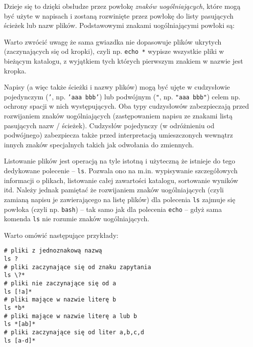 Dzieje się to dzięki obsłudze przez powłokę \textit{znaków uogólniających}, które mogą być użyte w napisach i zostaną rozwinięte przez powłokę do listy pasujących ścieżek lub nazw plików.
Podstawowymi znakami uogólniającymi powłoki są:
Warto zwrócić uwagę że sama gwiazdka nie dopasowuje plików ukrytych (zaczynających się od kropki), czyli np. \Verb$echo *$ wypisze wszystkie pliki w bieżącym katalogu, z wyjątkiem tych których pierwszym znakiem w nazwie jest kropka.

Napisy (a więc także ścieżki i nazwy plików) mogą być ujęte w cudzysłowie pojedynczym (\texttt{'}, np. \texttt{'aaa bbb'}) lub podwójnym (\texttt{"}, np. \texttt{"aaa bbb"}) celem np. ochrony spacji w nich występujących.
Oba typy cudzysłowów zabezpieczają przed rozwijaniem znaków uogólniających (zastępowaniem napisu ze znakami listą pasujących nazw / ścieżek).
Cudzysłów pojedynczy (w odróżnieniu od podwójnego) zabezpiecza także przed interpretacją umieszczonych wewnątrz innych znaków specjalnych takich jak odwołania do zmiennych.

Listowanie plików jest operacją na tyle istotną i użyteczną że istnieje do tego dedykowane polecenie – \Verb$ls$. Pozwala ono na m.in. wypisywanie szczegółowych informacji o plikach, listowanie całej zawartości katalogu, sortowanie wyników itd.
Należy jednak pamiętać że rozwijaniem znaków uogólniających (czyli zamianą napisu je zawierającego na listę plików) dla polecenia \Verb$ls$ zajmuje się powłoka (czyli np. \Verb$bash$) – tak samo jak dla polecenia \Verb$echo$ – gdyż sama komenda \Verb$ls$ nie rozumie znaków uogólniających.

\begin{teacherOnly}
Warto omówić następujące przykłady:
\begin{Verbatim}
# pliki z jednoznakową nazwą
ls ?
# pliki zaczynające się od znaku zapytania
ls \?*
# pliki nie zaczynające się od a
ls [!a]*
# pliki mające w nazwie literę b
ls *b*
# pliki mające w nazwie literę a lub b
ls *[ab]*
# pliki zaczynające się od liter a,b,c,d
ls [a-d]*
\end{Verbatim}
\end{teacherOnly}

